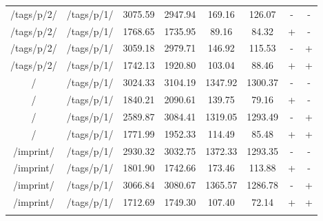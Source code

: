 \begin{appendix}
\begin{center}
\begin{longtable}{cccccccc}
\hline
/tags/p/2/ & /tags/p/1/ & 3075.59 & 2947.94 & 169.16 & 126.07 & - & - \\
/tags/p/2/ & /tags/p/1/ & 1768.65 & 1735.95 & 89.16 & 84.32 & + & - \\
/tags/p/2/ & /tags/p/1/ & 3059.18 & 2979.71 & 146.92 & 115.53 & - & + \\
/tags/p/2/ & /tags/p/1/ & 1742.13 & 1920.80 & 103.04 & 88.46 & + & + \\
\hline
\hline
/ & /tags/p/1/ & 3024.33 & 3104.19 & 1347.92 & 1300.37 & - & - \\
/ & /tags/p/1/ & 1840.21 & 2090.61 & 139.75 & 79.16 & + & - \\
/ & /tags/p/1/ & 2589.87 & 3084.41 & 1319.05 & 1293.49 & - & + \\
/ & /tags/p/1/ & 1771.99 & 1952.33 & 114.49 & 85.48 & + & + \\
\hline
/imprint/ & /tags/p/1/ & 2930.32 & 3032.75 & 1372.33 & 1293.35 & - & - \\
/imprint/ & /tags/p/1/ & 1801.90 & 1742.66 & 173.46 & 113.88 & + & - \\
/imprint/ & /tags/p/1/ & 3066.84 & 3080.67 & 1365.57 & 1286.78 & - & + \\
/imprint/ & /tags/p/1/ & 1712.69 & 1749.30 & 107.40 & 72.14 & + & + \\
\hline
\label{tab:selenium_results_external}
\end{longtable}
\end{center}
\end{appendix}
